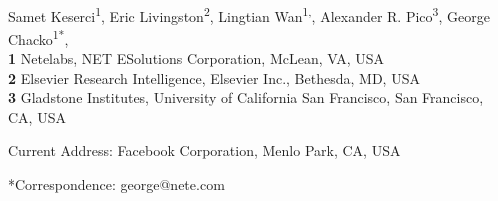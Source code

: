 \documentclass[10pt,letterpaper]{article}
\date{}
\begin{document}
\vspace*{0.2in}

\begin{flushleft}
{\Large
\textbf{} %
}
\newline
\\
Samet Keserci\textsuperscript{1},
Eric Livingston\textsuperscript{2},
Lingtian Wan\textsuperscript{1,\textcurrency},
Alexander R. Pico\textsuperscript{3},
George Chacko\textsuperscript{1*},
\\
\bigskip
\textbf{1} Netelabs, NET ESolutions Corporation, McLean, VA, USA
\\
\textbf{2} Elsevier Research Intelligence, Elsevier Inc., Bethesda, MD, USA
\\
\textbf{3} Gladstone Institutes, University of California San Francisco, San Francisco, CA, USA
\\
\bigskip

% 
%


\textcurrency Current Address: Facebook Corporation, Menlo Park, CA, USA %



*Correspondence: george@nete.com
\end{flushleft}
\end{document}
